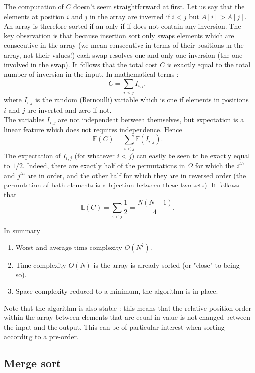 \documentclass[12pt]{article}
\theoremstyle{plain}
\theoremstyle{remark}
\begin{document}
The computation of $C$ doesn't seem straightforward at first. Let us say that
the elements at position $i$ and $j$ in the array are inverted if $i < j$ but 
$A[i] > A[j].$ An array is therefore sorted if an only if if does not contain
any inversion. The key observation is that because insertion sort only swaps
elements which are consecutive in the array (we mean consecutive in terms of
their positions in the array, not their values!) each swap resolves one and
only one inversion (the one involved in the swap). It follows that the total
cost $C$ is exactly equal to the total number of inversion in the input. In
mathematical terms :
$$
 C = \sum_{i < j} I_{i,j},
$$
where $I_{i,j}$ is the random (Bernoulli) variable which is one if elements
in positions $i$ and $j$ are inverted and zero if not.\\
The variables $I_{i,j}$ are not independent between themselves, but expectation
is a linear feature which does not requires independence. Hence
$$
\mathbb{E}(C) = \sum_{i<j} \mathbb{E}(I_{i,j}).
$$
The expectation of $I_{i,j}$ (for whatever $i < j$) can easily be seen to be
exactly equal to $1/2.$ Indeed, there are exactly half of the permutations in
$\Omega$ for which the $i^{th}$ and $j^{th}$ are in order, and the other half
for which they are in reversed order (the permutation of both elements is a
bijection between these two sets). It follows that
$$
\mathbb{E}(C) = \sum_{i<j} \frac{1}{2} = \frac{N(N-1)}{4}.
$$

In summary

\begin{enumerate}
	\item Worst and average time complexity $O(N^2)$.
	\item Time complexity $O(N)$ is the array is already sorted (or "close" to
		being so).
	\item Space complexity reduced to a minimum, the algorithm is in-place.
\end{enumerate}

Note that the algorithm is also stable : this means that the relative position order within the array
between elements that are equal in value is not changed between the input and
the output. This can be of particular interest when sorting according to a
pre-order.

\subsection{Merge sort}
\end{document}
